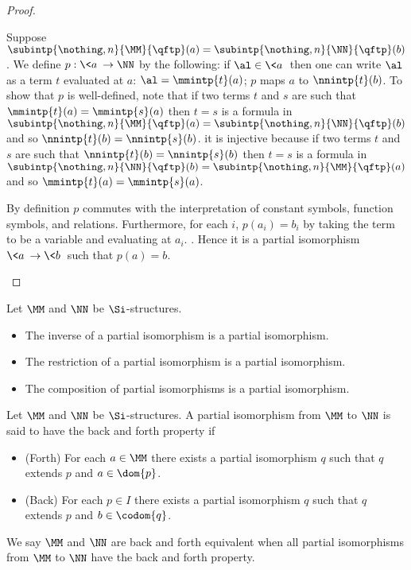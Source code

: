 \begin{proof}
    \begin{backward}
        Suppose $\subintp{\nothing,n}{\MM}{\qftp}(a) = 
        \subintp{\nothing,n}{\NN}{\qftp}(b)$.
        We define $p : \<a\> \to \NN$ by the following:
        if $\al \in \<a\>$ then one can write $\al$ as a term $t$ evaluated
        at $a$: $\al = \mmintp{t}(a)$; $p$ maps $a$ to $\nnintp{t}(b)$.
        To show that $p$ is well-defined, note that if two terms $t$ and $s$
        are such that $\mmintp{t}(a) = \mmintp{s}(a)$ then 
        $t = s$ is a formula in $\subintp{\nothing,n}{\MM}{\qftp}(a) = 
        \subintp{\nothing,n}{\NN}{\qftp}(b)$ and so 
        $\nnintp{t}(b) = \nnintp{s}(b)$.
        it is injective because if two terms $t$ and $s$
        are such that $\nnintp{t}(b) = \nnintp{s}(b)$ then 
        $t = s$ is a formula in $\subintp{\nothing,n}{\NN}{\qftp}(b) = 
        \subintp{\nothing,n}{\MM}{\qftp}(a)$ and so 
        $\mmintp{t}(a) = \mmintp{s}(a)$.

        By definition $p$ commutes with the interpretation of constant symbols,
        function symbols, and relations.
        Furthermore, for each $i$, $p(a_i) = b_i$ by taking the term to be a 
        variable and evaluating at $a_i$. 
        .
        Hence it is a partial isomorphism $\<a\> \to \<b\>$ 
        such that $p(a) = b$.
    \end{backward}
\end{proof}

\begin{prop}
    Let $\MM$ and $\NN$ be $\Si$-structures.
    \begin{itemize}
        \item The inverse of a partial isomorphism is a partial isomorphism.
        \item The restriction of a partial isomorphism is a partial isomorphism.
        \item The composition of partial isomorphisms is a partial isomorphism.
    \end{itemize}
\end{prop}

\begin{dfn}
    Let $\MM$ and $\NN$ be $\Si$-structures.
    A partial isomorphism from $\MM$ to $\NN$ is said to have 
    the back and forth property if 
    \begin{itemize}
        \item (Forth) For each $a \in \MM$
            there exists a partial isomorphism $q$ such that 
            $q$ extends $p$ and $a \in \dom{p}$.
        \item (Back) For each $p \in I$ 
            there exists a partial isomorphism $q$ such that 
            $q$ extends $p$ and $b \in \codom{q}$.
    \end{itemize}

    We say $\MM$ and $\NN$ are back and forth equivalent 
    when all partial isomorphisms from $\MM$ to $\NN$ 
    have the back and forth property.
\end{dfn}

